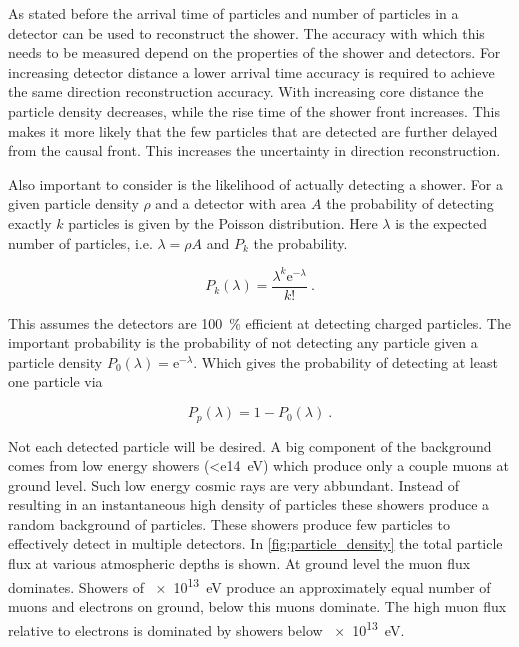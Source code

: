As stated before the arrival time of particles and number of particles in a detector can be used to reconstruct the shower. The accuracy with which this needs to be measured depend on the properties of the shower and detectors. For increasing detector distance a lower arrival time accuracy is required to achieve the same direction reconstruction accuracy. With increasing core distance the particle density decreases, while the rise time of the shower front increases. This makes it more likely that the few particles that are detected are further delayed from the causal front. This increases the uncertainty in direction reconstruction.

Also important to consider is the likelihood of actually detecting a shower. For a given particle density $\rho$ and a detector with area $A$ the probability of detecting exactly $k$ particles is given by the Poisson distribution. Here $\lambda$ is the expected number of particles, i.e. $\lambda = \rho A$ and $P_k$ the probability.

\begin{equation}
    P_k(\lambda) = \frac{\lambda^k \mathrm{e}^{-\lambda}}{k!} \ .
\end{equation}

This assumes the detectors are \SI{100}{\percent} efficient at detecting charged particles. The important probability is the probability of not detecting any particle given a particle density $P_0(\lambda) = \mathrm{e}^{-\lambda}$. Which gives the probability of detecting at least one particle via

\begin{equation}
    P_p(\lambda) = 1-P_0(\lambda) \ .
\end{equation}

Not each detected particle will be desired. A big component of the background comes from low energy showers (\SI{<e14}{\eV}) which produce only a couple muons at ground level. Such low energy cosmic rays are very abbundant. Instead of resulting in an instantaneous high density of particles these showers produce a random background of particles. These showers produce few particles to effectively detect in multiple detectors. In \cref{fig:particle_density} the total particle flux at various atmospheric depths is shown. At ground level the muon flux dominates. Showers of \SI{e13}{\eV} produce an approximately equal number of muons and electrons on ground, below this muons dominate. The high muon flux relative to electrons is dominated by showers below \SI{e13}{\eV}.

